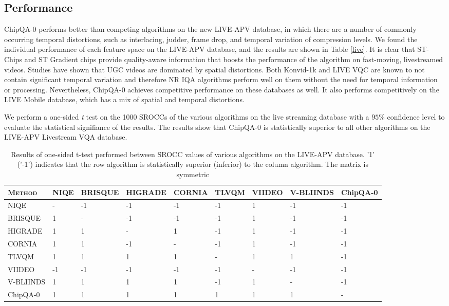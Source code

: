 \documentclass[conference]{IEEEtran}
\begin{document}
\subsection{Performance}
ChipQA-0 performs better than competing algorithms on the new LIVE-APV database, in which there are a number of commonly occurring temporal distortions, such as interlacing, judder, frame drop, and temporal variation of compression levels. We found the individual performance of each feature space  on the LIVE-APV database, and the results are shown in Table \ref{live}. It is clear that ST-Chips and ST Gradient chips provide  quality-aware information that boosts the performance of the algorithm on fast-moving, livestreamed videos. Studies have shown that UGC videos are dominated by spatial distortions\cite{liheng}. Both Konvid-1k and LIVE VQC are known to not contain  significant temporal variation and therefore NR IQA algorithms perform well on them without the need for temporal information or processing. Nevertheless, ChipQA-0 achieves competitive performance on these databases as well. It also performs competitively on the LIVE Mobile database, which has a mix of spatial and temporal distortions.

We perform a one-sided \textit{t} test on the 1000 SROCCs of the various algorithms on the live streaming database with a $95\%$ confidence level to evaluate the statistical signifiance of the results. The results show that ChipQA-0 is statistically superior to all other algorithms on the LIVE-APV Livestream VQA database.

\color{black}
\begin{table*}
\caption{Results of one-sided t-test performed between SROCC values of various algorithms on the LIVE-APV database. '1' ('-1') indicates that the row algorithm is statistically superior (inferior) to the column algorithm. The matrix is symmetric}
\begin{center}
\begin{tabular}{|l|l|l|l|l|l|l|l|l|}
\hline
\textsc{Method}  &  NIQE & BRISQUE & HIGRADE & CORNIA & TLVQM & VIIDEO &  V-BLIINDS & ChipQA-0  \\
\hline
NIQE & - & -1 & -1 & -1 & -1 & 1 & -1 & -1 \\
\hline
BRISQUE & 1 &  - & -1 & -1 & -1 & 1 & -1 & -1 \\
\hline
HIGRADE  &  1 & 1 & - & 1 & -1 & 1 & -1 & -1  \\
\hline
CORNIA  & 1 & 1 & -1 & - & -1 & 1 & -1 & -1  \\
\hline
TLVQM &  1 & 1 & 1 & 1 & - & 1 & 1 & -1\\
\hline
VIIDEO &  -1 &-1 & -1 & -1 & -1 & - & -1 & -1\\
\hline
V-BLIINDS & 1 & 1 & 1 & 1 & -1 & 1 & - & -1 \\
\hline
ChipQA-0 &  1 & 1 & 1 & 1 & 1 & 1 & 1 & -  \\
\hline
\end{tabular}
\label{stat}
\end{center}
\end{table*}
\end{document}
